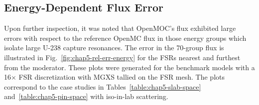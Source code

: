 \subsection{Energy-Dependent Flux Error}
\label{subsec:chap5-diagnosis-energy}

Upon further inspection, it was noted that OpenMOC's flux exhibited large errors with respect to the reference OpenMC flux in those energy groups which isolate large U-238 capture resonances. The error in the 70-group flux is illustrated in Fig.~\ref{fig:chap5-rel-err-energy} for the \ac{FSR}s nearest and furthest from the moderator. These plots were generated for the benchmark models with a 16$\times$ \ac{FSR} discretization with \ac{MGXS} tallied on the \ac{FSR} mesh. The plots correspond to the case studies in Tables~\ref{table:chap5-slab-space} and~\ref{table:chap5-pin-space} with iso-in-lab scattering.

